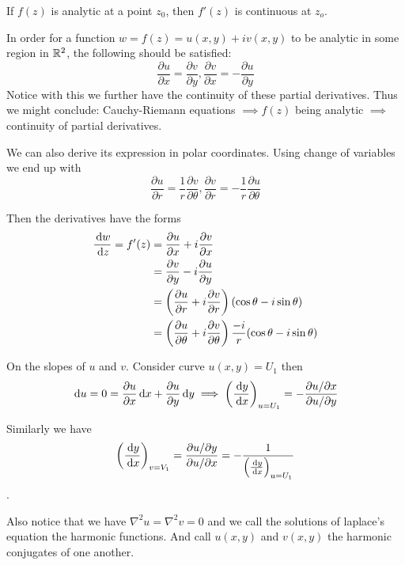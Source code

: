 \documentclass{article}
\begin{document}
\begin{theorem}
    If \(f(z)\) is analytic at a point \(z_0\), then \(f'(z)\) is continuous at \(z_o\).
\end{theorem}

\begin{theorem}
    In order for a function \(w=f(z)=u(x,y)+iv(x,y)\) to be analytic in some region in \(\mathbb{R}^2\), the following should be satisfied:
    \[\frac{\partial u}{\partial x}=\frac{\partial v}{\partial y}, \frac{\partial v}{\partial x}=-\frac{\partial u}{\partial y}\]
    Notice with this we further have the continuity of these partial derivatives. Thus we might conclude: Cauchy-Riemann equations \(\implies f(z)\) being analytic \(\implies\) continuity of partial derivatives.

    We can also derive its expression in polar coordinates. Using change of variables we end up with
    \[\frac{\partial u}{\partial r}=\frac{1}{r}\frac{\partial v}{\partial \theta}, \frac{\partial v}{\partial r}=-\frac{1}{r}\frac{\partial u}{\partial \theta}\]
\end{theorem}

\begin{corollary}
    Then the derivatives have the forms
    \begin{align*}
        \frac{\,\mathrm{d} w}{\,\mathrm{d} z}=f'(z) &= \frac{\partial u}{\partial x} +i\frac{\partial v}{\partial x}\\
         &= \frac{\partial v}{\partial y}-i\frac{\partial u}{\partial y}\\
         &= \left( \frac{\partial u}{\partial r}+i\frac{\partial v}{\partial r} \right)(\cos\theta-i\sin\theta)\\
         &= \left( \frac{\partial u}{\partial \theta}+i\frac{\partial v}{\partial \theta} \right)\frac{-i}{r}(\cos\theta-i\sin\theta)
    \end{align*}
\end{corollary}

On the slopes of \(u\) and \(v\). Consider curve \(u(x,y)=U_1\) then
\[\,\mathrm{d} u=0=\frac{\partial u}{\partial x}\,\mathrm{d} x+\frac{\partial u}{\partial y}\,\mathrm{d} y\implies \left( \frac{\,\mathrm{d} y}{\,\mathrm{d} x} \right)_{u=U_1} = -\frac{\partial u/\partial x}{\partial u/\partial y}\]

Similarly we have \[\left( \frac{\,\mathrm{d} y}{\,\mathrm{d} x} \right)_{v=V_1} = \frac{\partial u/\partial y}{\partial u/\partial x} = -\frac{1}{ \left( \frac{\,\mathrm{d} y}{\,\mathrm{d} x} \right)_{u=U_1}}\].

Also notice that we have \(\nabla^2 u=\nabla^2 v=0\) and we call the solutions of laplace's equation the harmonic functions. And call \(u(x,y)\) and \(v(x,y)\) the harmonic conjugates of one another.
\end{document}
